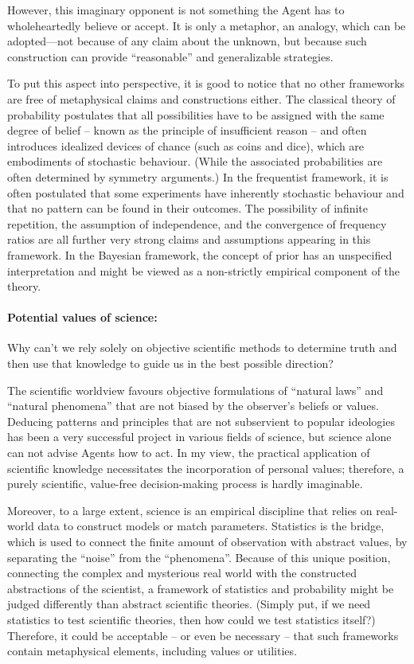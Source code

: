 \documentclass{article}
\begin{document}
However, this imaginary opponent is not something the Agent has to wholeheartedly believe or accept. It is only a metaphor, an analogy, which can be adopted—not because of any claim about the unknown, but because such construction can provide ``reasonable'' and generalizable strategies.

To put this aspect into perspective, it is good to notice that no other frameworks are free of metaphysical claims and constructions either.
The classical theory of probability postulates that all possibilities have to be assigned with the same degree of belief -- known as the principle of insufficient reason -- and often introduces idealized devices of chance (such as coins and dice), which are embodiments of stochastic behaviour. (While the associated probabilities are often determined by symmetry arguments.)
In the frequentist framework, it is often postulated that some experiments have inherently stochastic behaviour and that no pattern can be found in their outcomes. The possibility of infinite repetition, the assumption of independence, and the convergence of frequency ratios are all further very strong claims and assumptions appearing in this framework.
In the Bayesian framework, the concept of prior has an unspecified interpretation and might be viewed as a non-strictly empirical component of the theory.

\paragraph{Potential values of science:}
Why can’t we rely solely on objective scientific methods to determine truth and then use that knowledge to guide us in the best possible direction?

The scientific worldview favours objective formulations of ``natural laws'' and ``natural phenomena'' that are not biased by the observer’s beliefs or values. Deducing patterns and principles that are not subservient to popular ideologies has been a very successful project in various fields of science, but science alone can not advise Agents how to act.
In my view, the practical application of scientific knowledge necessitates the incorporation of personal values; therefore, a purely scientific, value-free decision-making process is hardly imaginable.

Moreover, to a large extent, science is an empirical discipline that relies on real-world data to construct models or match parameters. Statistics is the bridge, which is used to connect the finite amount of observation with abstract values, by separating the ``noise'' from the ``phenomena''. Because of this unique position, connecting the complex and mysterious real world with the constructed abstractions of the scientist, a framework of statistics and probability might be judged differently than abstract scientific theories. (Simply put, if we need statistics to test scientific theories, then how could we test statistics itself?) Therefore, it could be acceptable -- or even be necessary -- that such frameworks contain metaphysical elements, including values or utilities. 
\end{document}
